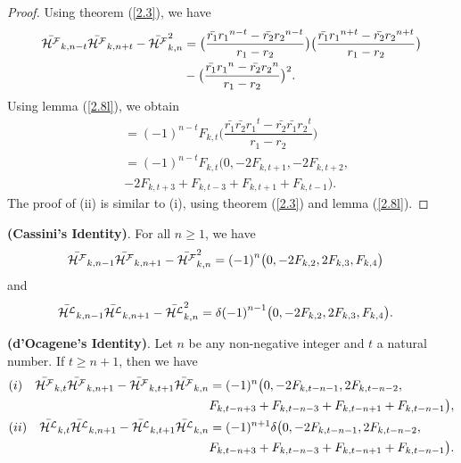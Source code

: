 \begin{proof}
Using theorem (\ref{2.3}), we have
\begin{align*}
\bar{{\mathcal{H^F}}}_{k,n-t}\bar{{\mathcal{H^F}}}_{k,n+t}-{\bar{{\mathcal{H^F}}}_{k,n}}^2&=\big(\dfrac{\bar{r_1}{{r_1}}^{n-t}-\bar{r_2}{r_{2}}^{n-t}}{r_1-r_2}\big)\big(\dfrac{\bar{r_1}{{r_1}}^{n+t}-\bar{r_2}{r_{2}}^{n+t}}{r_1-r_2}\big)\\&-\big(\dfrac{\bar{r_1}{{r_1}}^{n}-\bar{r_2}{r_{2}}^{n}}{r_1-r_2}\big)^2.
\end{align*}
Using lemma (\ref{2.8l}), we obtain
\begin{align*}
&=(-1)^{n-t}F_{k,t}\big(\dfrac{\bar{r_1}\bar{r_2}{{r_1}}^{t}-\bar{r_2}\bar{r_1}{r_{2}}^{t}}{r_1-r_2}\big)\\
&={(-1)}^{n-t}{{F}_{k,t}}\big(0, -2F_{k,t+1},-2F_{k,t+2},\\& -2F_{k,t+3}+F_{k,t-3}+F_{k,t+1}+F_{k,t-1}\big).
\end{align*}
The proof of (ii) is similar to (i), using theorem (\ref{2.3}) and lemma (\ref{2.8l}).
\end{proof}
\begin{theorem}\textbf{(Cassini's Identity)}. For all $n\geq{1}$, we have\label{2.10t}
\begin{align*}
\bar{{\mathcal{H^F}}}_{k,n-1}\bar{{\mathcal{H^F}}}_{k,n+1}-{\bar{{\mathcal{H^F}}}_{k,n}}^2&={(-1)}^{n}\big(0, -2F_{k,2},2F_{k,3}, F_{k,4}\big)
\end{align*}
and
\begin{align*}
\bar{{\mathcal{H^L}}}_{k,n-1}\bar{{\mathcal{H^L}}}_{k,n+1}-{\bar{{\mathcal{H^L}}}_{k,n}}^2&={\delta(-1)}^{n-1}\big(0, -2F_{k,2},2F_{k,3}, F_{k,4}\big).
\end{align*}
\end{theorem}
\begin{theorem}\textbf{(d'Ocagene's Identity)}. Let $n$ be any non-negative integer and $t$ a natural number. If $t\geq {n+1}$, then we have\label{2.11t}
\begin{align*}
(i)\quad\bar{{\mathcal{H^F}}}_{k,t}\bar{{\mathcal{H^F}}}_{k,n+1}-\bar{{\mathcal{H^F}}}_{k,t+1}\bar{{\mathcal{H^F}}}_{k,n}&=(-1)^n \big(0, -2F_{k,t-n-1},2F_{k,t-n-2}, \\&F_{k,t-n+3}+F_{k,t-n-3}+F_{k,t-n+1}+F_{k,t-n-1}\big),\\
(ii)\quad\bar{{\mathcal{H^L}}}_{k,t}\bar{{\mathcal{H^L}}}_{k,n+1}-\bar{{\mathcal{H^L}}}_{k,t+1}\bar{{\mathcal{H^L}}}_{k,n}&=(-1)^{n+1}\delta \big(0, -2F_{k,t-n-1},2F_{k,t-n-2},\\& F_{k,t-n+3}+F_{k,t-n-3}+F_{k,t-n+1}+F_{k,t-n-1}\big).
\end{align*}
\end{theorem}
